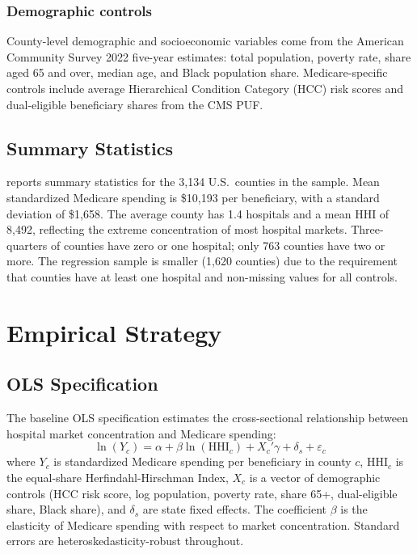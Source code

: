 \documentclass[12pt]{article}
\begin{document}
\subsubsection*{Demographic controls} County-level demographic and socioeconomic variables come from the American Community Survey 2022 five-year estimates: total population, poverty rate, share aged 65 and over, median age, and Black population share. Medicare-specific controls include average Hierarchical Condition Category (HCC) risk scores and dual-eligible beneficiary shares from the CMS PUF.

\subsection{Summary Statistics}

 reports summary statistics for the 3,134 U.S.\ counties in the sample. Mean standardized Medicare spending is \$10,193 per beneficiary, with a standard deviation of \$1,658. The average county has 1.4 hospitals and a mean HHI of 8,492, reflecting the extreme concentration of most hospital markets. Three-quarters of counties have zero or one hospital; only 763 counties have two or more. The regression sample is smaller (1,620 counties) due to the requirement that counties have at least one hospital and non-missing values for all controls.




\section{Empirical Strategy}

\subsection{OLS Specification}

The baseline OLS specification estimates the cross-sectional relationship between hospital market concentration and Medicare spending:
\begin{equation}
\label{eq:ols}
\ln(Y_c) = \alpha + \beta \ln(\text{HHI}_c) + X_c'\gamma + \delta_s + \varepsilon_c
\end{equation}
where $Y_c$ is standardized Medicare spending per beneficiary in county $c$, $\text{HHI}_c$ is the equal-share Herfindahl-Hirschman Index, $X_c$ is a vector of demographic controls (HCC risk score, log population, poverty rate, share 65+, dual-eligible share, Black share), and $\delta_s$ are state fixed effects. The coefficient $\beta$ is the elasticity of Medicare spending with respect to market concentration. Standard errors are heteroskedasticity-robust throughout.
\end{document}
